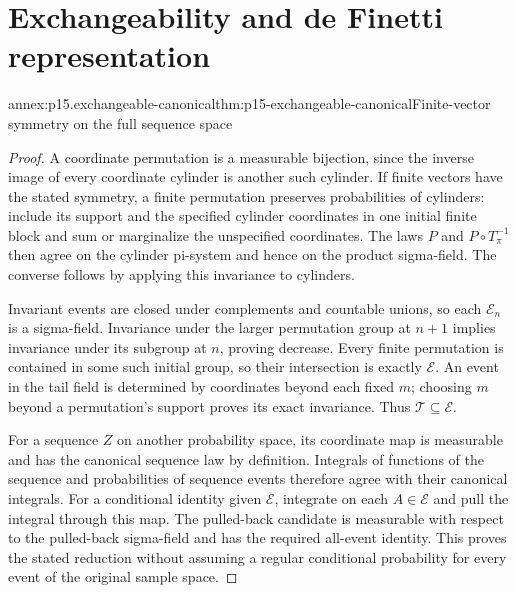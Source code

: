 \section{Exchangeability and de Finetti representation}
\label{sec:annex-p15-exchangeability-and-definetti}

\begin{annexitem}{annex:p15.exchangeable-canonical}{thm:p15-exchangeable-canonical}{Finite-vector symmetry on the full sequence space}
\begin{proof}
A coordinate permutation is a measurable bijection, since the inverse
image of every coordinate cylinder is another such cylinder.
If finite vectors have the stated symmetry, a finite permutation
preserves probabilities of cylinders: include its support and the
specified cylinder coordinates in one initial finite block and sum
or marginalize the unspecified coordinates.
The laws \(P\) and \(P\circ T_\pi^{-1}\) then agree on the cylinder
pi-system and hence on the product sigma-field.
The converse follows by applying this invariance to cylinders.

Invariant events are closed under complements and countable unions,
so each \(\mathcal E_n\) is a sigma-field.
Invariance under the larger permutation group at \(n+1\) implies
invariance under its subgroup at \(n\), proving decrease.
Every finite permutation is contained in some such initial group,
so their intersection is exactly \(\mathcal E\).
An event in the tail field is determined by coordinates beyond each
fixed \(m\); choosing \(m\) beyond a permutation's support proves
its exact invariance. Thus \(\mathcal T\subseteq\mathcal E\).

For a sequence \(Z\) on another probability space, its coordinate map
is measurable and has the canonical sequence law by definition.
Integrals of functions of the sequence and probabilities of sequence
events therefore agree with their canonical integrals.
For a conditional identity given \(\mathcal E\), integrate on
each \(A\in\mathcal E\) and pull the integral through this map.
The pulled-back candidate is measurable with respect to the
pulled-back sigma-field and has the required all-event identity.
This proves the stated reduction without assuming a regular
conditional probability for every event of the original sample space.
\end{proof}
\end{annexitem}

